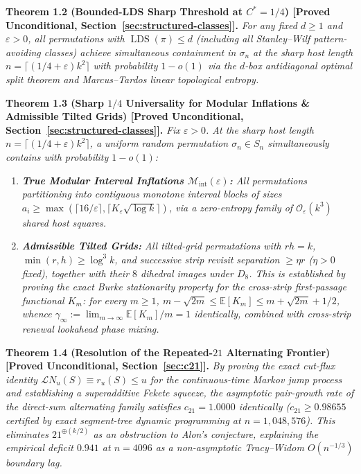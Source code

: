 \documentclass[
  11pt,
]{article}
\providecommand{\tightlist}{%
  \setlength{\itemsep}{0pt}\setlength{\parskip}{0pt}}
\begin{document}
\textbf{Theorem 1.2 (Bounded-LDS Sharp Threshold at $C^* = 1/4$) [Proved Unconditional, Section~\ref{sec:structured-classes}].}
\emph{For any fixed $d \ge 1$ and $\varepsilon > 0$, all permutations with $\operatorname{LDS}(\pi) \le d$ (including all Stanley--Wilf pattern-avoiding classes) achieve simultaneous containment in $\sigma_n$ at the sharp host length $n = \lceil(1/4+\varepsilon)k^2\rceil$ with probability $1 - o(1)$ via the $d$-box antidiagonal optimal split theorem and Marcus--Tardos linear topological entropy.}

\textbf{Theorem 1.3 (Sharp $1/4$ Universality for Modular Inflations \& Admissible Tilted Grids) [Proved Unconditional, Section~\ref{sec:structured-classes}].}
\emph{Fix $\varepsilon > 0$. At the sharp host length $n = \lceil(1/4 + \varepsilon)k^2\rceil$, a uniform random permutation $\sigma_n \in S_n$ simultaneously contains with probability $1 - o(1)$:}
\begin{enumerate}
\def\labelenumi{(\alph{enumi})}
\tightlist
\item \emph{\textbf{True Modular Interval Inflations $\mathcal{M}_{\mathrm{int}}(\varepsilon)$:} All permutations partitioning into contiguous monotone interval blocks of sizes $a_i \ge \max(\lceil 16/\varepsilon \rceil, \lceil K_\varepsilon \sqrt{\log k} \rceil)$, via a zero-entropy family of $\mathcal{O}_\varepsilon(k^3)$ shared host squares.}
\item \emph{\textbf{Admissible Tilted Grids:} All tilted-grid permutations with $r h = k$, $\min(r, h) \ge \log^3 k$, and successive strip revisit separation $\ge \eta r$ ($\eta > 0$ fixed), together with their $8$ dihedral images under $D_8$. This is established by proving the exact Burke stationarity property for the cross-strip first-passage functional $K_m$: for every $m \ge 1$, $m - \sqrt{2m} \le \mathbb{E}[K_m] \le m + \sqrt{2m} + 1/2$, whence $\gamma_\infty := \lim_{m \to \infty} \mathbb{E}[K_m]/m = 1$ identically, combined with cross-strip renewal lookahead phase mixing.}
\end{enumerate}

\textbf{Theorem 1.4 (Resolution of the Repeated-$21$ Alternating Frontier) [Proved Unconditional, Section~\ref{sec:c21}].}
\emph{By proving the exact cut-flux identity $\mathcal{L} N_u(S) \equiv r_u(S) \le u$ for the continuous-time Markov jump process and establishing a superadditive Fekete squeeze, the asymptotic pair-growth rate of the direct-sum alternating family satisfies $c_{21} = 1.0000$ identically ($c_{21} \ge 0.98655$ certified by exact segment-tree dynamic programming at $n = 1{,}048{,}576$). This eliminates $21^{\oplus (k/2)}$ as an obstruction to Alon's conjecture, explaining the empirical deficit $0.941$ at $n = 4096$ as a non-asymptotic Tracy--Widom $O(n^{-1/3})$ boundary lag.}
\end{document}
